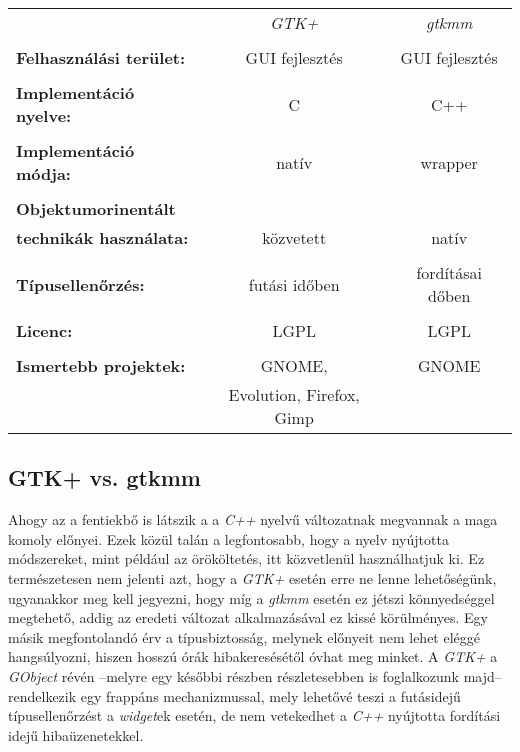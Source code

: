 \documentclass[a4paper,10pt]{article}
\begin{document}
\begin{tabular}[t]{l c c}
                                       & \textit{GTK+}                     & \textit{gtkmm}   \\\\
\textbf{Felhasználási terület:}        & GUI fejlesztés                    & GUI fejlesztés   \\\\
\textbf{Implementáció nyelve:}         & C                                 & C++              \\\\
\textbf{Implementáció módja:}          & natív                             & wrapper          \\\\
\textbf{Objektumorinentált}            &                                   &                  \\
\textbf{technikák használata:}         & közvetett                         & natív            \\\\
\textbf{Típusellenőrzés:}              & futási időben                     & fordításai dőben \\\\
\textbf{Licenc:}                       & LGPL                              & LGPL             \\\\
\textbf{Ismertebb projektek:}          & GNOME,                            & GNOME            \\
                                       & Evolution, Firefox, Gimp          &                  \\
\end{tabular}


\subsection{GTK+ vs. gtkmm}
Ahogy az a fentiekbő is látszik a a \textit{C++} nyelvű változatnak megvannak a maga komoly előnyei. Ezek közül talán a legfontosabb, hogy a nyelv nyújtotta módszereket, mint például az örököltetés, itt közvetlenül használhatjuk ki. Ez természetesen nem jelenti azt, hogy a \textit{GTK+} esetén erre ne lenne lehetőségünk, ugyanakkor meg kell jegyezni, hogy míg a \textit{gtkmm} esetén ez jétszi könnyedséggel megtehető, addig az eredeti változat alkalmazásával ez kissé körülményes. Egy másik megfontolandó érv a típusbiztosság, melynek előnyeit nem lehet eléggé hangsúlyozni, hiszen hosszú órák hibakeresésétől óvhat meg minket. A \textit{GTK+} a \textit{GObject} révén --melyre egy későbbi részben részletesebben is foglalkozunk majd-- rendelkezik egy frappáns mechanizmussal, mely lehetővé teszi a futásidejű típusellenőrzést a \textit{widget}ek esetén, de nem vetekedhet a \textit{C++} nyújtotta fordítási idejű hibaüzenetekkel.
\end{document}
